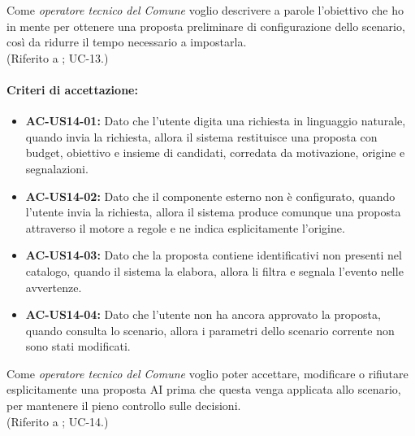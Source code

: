  \label{us:ai}
Come \textit{operatore tecnico del Comune} voglio descrivere a parole l'obiettivo che ho in mente per ottenere una proposta preliminare di configurazione dello scenario, così da ridurre il tempo necessario a impostarla. \\ (Riferito a ; UC-13.)

\paragraph{Criteri di accettazione:}
\begin{itemize}[leftmargin=1.4em]
    \item \textbf{AC-US14-01:} Dato che l'utente digita una richiesta in linguaggio naturale, quando invia la richiesta, allora il sistema restituisce una proposta con budget, obiettivo e insieme di candidati, corredata da motivazione, origine e segnalazioni.
    \item \textbf{AC-US14-02:} Dato che il componente esterno non è configurato, quando l'utente invia la richiesta, allora il sistema produce comunque una proposta attraverso il motore a regole e ne indica esplicitamente l'origine.
    \item \textbf{AC-US14-03:} Dato che la proposta contiene identificativi non presenti nel catalogo, quando il sistema la elabora, allora li filtra e segnala l'evento nelle avvertenze.
    \item \textbf{AC-US14-04:} Dato che l'utente non ha ancora approvato la proposta, quando consulta lo scenario, allora i parametri dello scenario corrente non sono stati modificati.
\end{itemize}

 \label{us:ai_appr}
Come \textit{operatore tecnico del Comune} voglio poter accettare, modificare o rifiutare esplicitamente una proposta AI prima che questa venga applicata allo scenario, per mantenere il pieno controllo sulle decisioni. \\ (Riferito a ; UC-14.)

